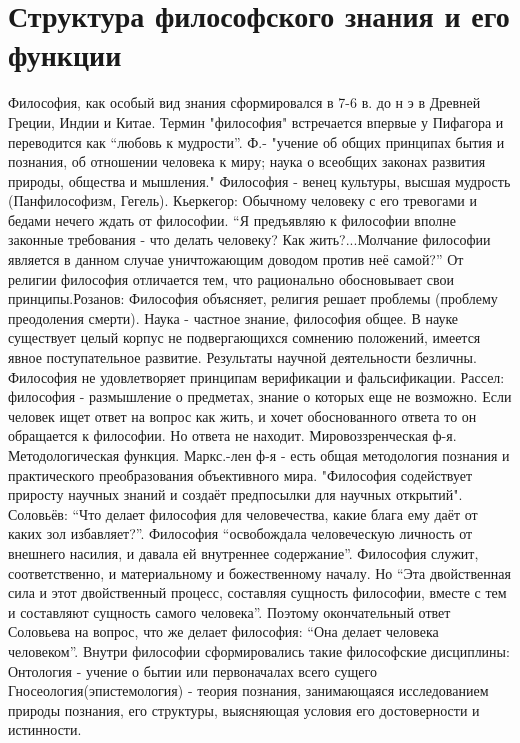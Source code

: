 \documentclass[12pt]{article}
\begin{document}
\section{Структура философского знания и его функции}
Философия, как особый вид знания сформировался в 7-6 в. до н э в Древней Греции, Индии и Китае. Термин
"философия" встречается впервые у Пифагора и переводится как “любовь к мудрости”. Ф.- "учение об общих
принципах бытия и познания, об отношении человека к миру; наука о всеобщих законах развития природы,
общества и мышления." Философия - венец культуры, высшая мудрость (Панфилософизм, Гегель). Кьеркегор:
Обычному человеку с его тревогами и бедами нечего ждать от философии. “Я предъявляю к философии вполне
законные  требования  -  что  делать  человеку?  Как  жить?...Молчание  философии  является  в  данном  случае
уничтожающим  доводом  против  неё  самой?”  От  религии  философия  отличается  тем,  что  рационально
обосновывает  свои  принципы.Розанов:  Философия  объясняет,  религия  решает  проблемы  (проблему
преодоления  смерти).  Наука  -  частное  знание,  философия  общее.  В  науке  существует  целый  корпус  не
подвергающихся  сомнению  положений,  имеется  явное  поступательное  развитие.  Результаты  научной
деятельности  безличны.  Философия  не  удовлетворяет  принципам  верификации  и  фальсификации.  Рассел:
философия - размышление о предметах, знание о которых еще не возможно. Если человек ищет ответ на вопрос
как  жить,  и  хочет  обоснованного  ответа  то  он  обращается  к  философии.  Но  ответа  не  находит.
Мировоззренческая ф-я. Методологическая функция. 
Маркс.-лен  ф-я  -  есть  общая  методология  познания  и  практического  преобразования  объективного  мира.
"Философия содействует приросту научных знаний и создаёт предпосылки для научных открытий".
Соловьёв: “Что делает философия для человечества, какие блага ему даёт от каких зол избавляет?”. 
Философия “освобождала человеческую личность от внешнего насилия, и давала ей внутреннее содержание”.
Философия служит, соответственно, и материальному и божественному началу. Но “Эта двойственная сила и
этот двойственный  процесс,  составляя  сущность философии,  вместе с тем и составляют сущность самого
человека”. Поэтому окончательный ответ Соловьева на вопрос, что же делает философия: “Она делает человека
человеком”.
Внутри философии сформировались такие философские дисциплины: 
Онтология - учение о бытии или первоначалах всего сущего
Гносеология(эпистемология)  -  теория  познания,  занимающаяся  исследованием  природы  познания,  его
структуры, выясняющая условия его достоверности и истинности.
\end{document}
